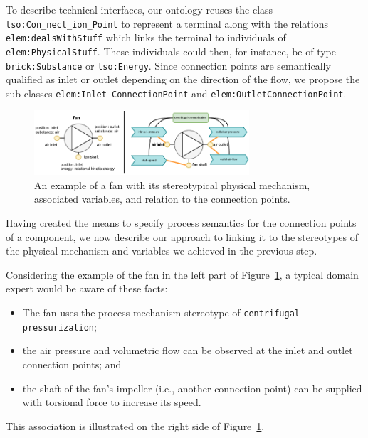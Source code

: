 \documentclass[sigconf]{acmart}
\begin{document}
To describe technical interfaces, our ontology reuses the class \texttt{tso:Con\_nect\_ion\_Point} to represent a terminal along with the relations \texttt{elem:dealsWithStuff} which links the terminal to individuals of \texttt{elem:Phy\-si\-cal\-Stuff}. These individuals could then, for instance, be of type \texttt{brick:Substance} or \texttt{tso:Energy}.
Since connection points are semantically qualified as inlet or outlet depending on the direction of the flow, we propose the sub-classes \texttt{elem:In\-let\--Conn\-ec\-tion\-Point} and \texttt{elem:Out\-let\-Conn\-ec\-tion\-Point}. 
\begin{figure}[t]
\centering
\includegraphics[width=8cm]{figures/a_lcm_variables_to_connections.pdf}
\caption{An example of a fan with its stereotypical physical mechanism, associated variables, and relation to the connection points.}
\label{fig:linking-connection-points-to-variables}
\end{figure}

Having created the means to specify process semantics for the connection points of a component, we now describe our approach to linking it to the stereotypes of the physical mechanism and variables we achieved in the previous step.

Considering the example of the fan in the left part of Figure~\ref{fig:linking-connection-points-to-variables}, a typical domain expert would be aware of these facts:

\begin{itemize}
    \item The fan uses the process mechanism stereotype of \texttt{cen\-tri\-fu\-gal press\-ur\-i\-za\-tion}; 
    \item the air pressure and volumetric flow can be observed at the inlet and outlet connection points; and
    \item the shaft of the fan's impeller (i.e., another connection point) can be supplied with torsional force to increase its speed.
\end{itemize}

This association is illustrated on the right side of Figure~\ref{fig:linking-connection-points-to-variables}.
\end{document}
